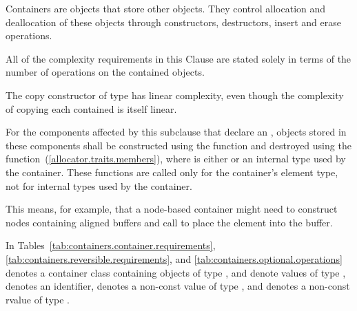 \pnum
Containers are objects that store other objects.
They control allocation and deallocation of these objects
through constructors, destructors, insert and erase operations.

\pnum
All of the complexity requirements in this Clause are stated solely
in terms of the number of operations on the contained objects.
\begin{example}
The copy constructor of type
has linear complexity,
even though the complexity of copying each contained
is itself linear.
\end{example}

\pnum
For the components affected by this subclause that declare an ,
objects stored in these components shall be constructed using the
 function
and destroyed using the
function~(\ref{allocator.traits.members}),
where  is either  or
an internal type used by the container.
These functions are called only for the
container's element type, not for internal types used by the container. \begin{note} This
means, for example, that a node-based container might need to construct nodes containing
aligned buffers and call  to place the element into the buffer.
\end{note}

\pnum
In Tables~\ref{tab:containers.container.requirements},
\ref{tab:containers.reversible.requirements}, and
\ref{tab:containers.optional.operations}
 denotes a container class containing objects of type
,  and 
denote values of type , 
denotes an identifier,  denotes
a non-const value of type , and 
denotes a non-const rvalue of type .

